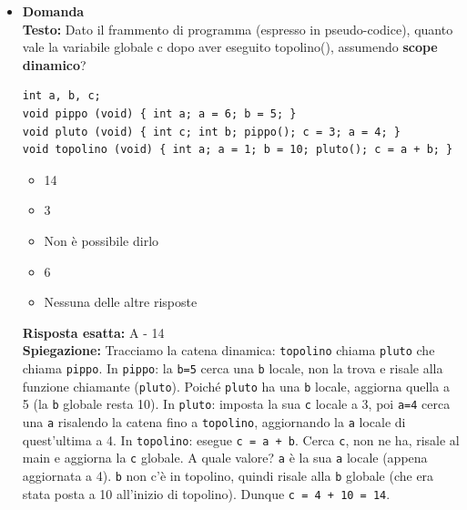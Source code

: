 \documentclass[12pt, a4paper]{article}
\newcounter{domandateoria}
\begin{document}
\begin{itemize}
    \item {}\textbf{Domanda \thedomandateoria} \\
    \textbf{Testo:} Dato il frammento di programma (espresso in pseudo-codice), quanto vale la variabile globale c dopo aver eseguito topolino(), assumendo \textbf{scope dinamico}?
\begin{verbatim}
int a, b, c;
void pippo (void) { int a; a = 6; b = 5; }
void pluto (void) { int c; int b; pippo(); c = 3; a = 4; }
void topolino (void) { int a; a = 1; b = 10; pluto(); c = a + b; }
\end{verbatim}
    \begin{itemize}
        \item[A)] 14
        \item[B)] 3
        \item[C)] Non è possibile dirlo
        \item[D)] 6
        \item[E)] Nessuna delle altre risposte
    \end{itemize}
    \textbf{Risposta esatta:} A - 14 \\
    \textbf{Spiegazione:} Tracciamo la catena dinamica: \texttt{topolino} chiama \texttt{pluto} che chiama \texttt{pippo}. 
    In \texttt{pippo}: la \texttt{b=5} cerca una \texttt{b} locale, non la trova e risale alla funzione chiamante (\texttt{pluto}). Poiché \texttt{pluto} ha una \texttt{b} locale, aggiorna quella a 5 (la \texttt{b} globale resta 10). 
    In \texttt{pluto}: imposta la sua \texttt{c} locale a 3, poi \texttt{a=4} cerca una \texttt{a} risalendo la catena fino a \texttt{topolino}, aggiornando la \texttt{a} locale di quest'ultima a 4. 
    In \texttt{topolino}: esegue \texttt{c = a + b}. Cerca \texttt{c}, non ne ha, risale al main e aggiorna la \texttt{c} globale. A quale valore? \texttt{a} è la sua \texttt{a} locale (appena aggiornata a 4). \texttt{b} non c'è in topolino, quindi risale alla \texttt{b} globale (che era stata posta a 10 all'inizio di topolino). Dunque \texttt{c = 4 + 10 = 14}.
    \vspace{0.3cm}


\end{itemize}
\end{document}
